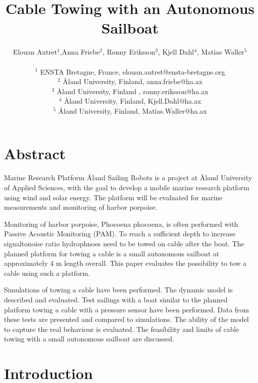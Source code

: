 \documentclass[11pt]{article} %
\title{ Cable Towing with an Autonomous Sailboat }
\author{Elouan Autret$^{1}$,Anna Friebe$^{2}$, Ronny Eriksson$^{3}$, Kjell Dahl$^{4}$, Matias Waller$^{5}$\\
\\
\normalsize{$^{1}$ ENSTA Bretagne, France, elouan.autret@ensta-bretagne.org}\\
\normalsize{$^{2}$ \r{A}land University, Finland, anna.friebe@ha.ax}\\
\normalsize{$^{3}$ \r{A}land University, Finland , ronny.eriksson@ha.ax}\\
\normalsize{$^{4}$ \r{A}land University, Finland, Kjell.Dahl@ha.ax}\\
\normalsize{$^{5}$ \r{A}land University, Finland, Matias.Waller@ha.ax}\\
}
\date{}
\begin{document}
\maketitle

\renewcommand{\contentsname}{Contents}	%
\renewcommand{\bibname}{Bibliography}	%


\section*{Abstract}
Marine Research Platform \r{A}land Sailing Robots is a project at \r{A}land University of Applied  Sciences, with the goal to develop a mobile marine research platform using wind and solar energy. The platform will be evaluated for marine measurements and monitoring of harbor porpoise.

Monitoring of harbor porpoise, Phocoena phocoena, is often performed with Passive Acoustic Monitoring (PAM). To reach a sufficient depth to increase signaltonoise ratio hydrophnoes need to be towed on cable after the boat. The planned platform for towing a cable is a small autonomous sailboat at approximately 4 m length overall. This paper evaluates the possibility to tow a cable using such a platform.
   
Simulations of towing a cable have been performed. The dynamic model is described and evaluated. Test sailings with a boat similar to the planned platform towing a cable with a pressure sensor have been performed. Data from these tests are presented and compared to simulations. The ability of the model to capture the real behaviour is evaluated. The feasibility and limits of cable towing with a small autonomous sailboat are discussed.
   



\section{Introduction}

\end{document}
